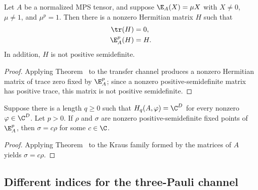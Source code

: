 \begin{lemma}
    \label{thm:hermitian-power-fixed-point}
    \leanok
    Let $A$ be a normalized MPS tensor, and suppose
    $\E_A(X)=\mu X$ with $X\neq0$, $\mu\neq1$, and $\mu^p=1$. Then there is a
    nonzero Hermitian matrix $H$ such that
    \begin{align}
        \tr(H)
         & =0,
        \notag \\
        \E_A^p(H)
         & =H.
        \notag
    \end{align}
    In addition, $H$ is not positive semidefinite.
\end{lemma}

\begin{proof}\leanok
    Applying
    Theorem~\cite[``Hermitian power-fixed point from a finite-order eigenmatrix'']{QICLean2026Blueprint}
    to the transfer channel produces a nonzero Hermitian matrix of trace zero
    fixed by $\E_A^p$; since a nonzero positive-semidefinite matrix has
    positive trace, this matrix is not positive semidefinite.
\end{proof}

\begin{lemma}
    \label{thm:mps-power-fixed-point-unique-from-spreading}
    \leanok
    Suppose there is a length $q\geq0$ such that
    $H_q(A,\varphi)=\C^D$ for every nonzero $\varphi\in\C^D$. Let $p>0$.
    If $\rho$ and $\sigma$ are nonzero positive-semidefinite fixed points of
    $\E_A^p$, then $\sigma=c\rho$ for some $c\in\C$.
\end{lemma}

\begin{proof}\leanok
    Applying
    Theorem~\cite[``Uniqueness of power-fixed positive matrices for a Kraus map'']{QICLean2026Blueprint}
    to the Kraus family formed by the matrices of $A$ yields $\sigma=c\rho$.
\end{proof}


\subsection{Different indices for the three-Pauli channel}

